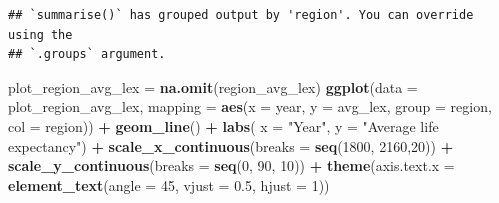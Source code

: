 \documentclass[
]{article}
\newenvironment{Shaded}{\begin{snugshade}}{\end{snugshade}}
\newcommand{\AttributeTok}[1]{\textcolor[rgb]{0.13,0.29,0.53}{#1}}
\newcommand{\CommentTok}[1]{\textcolor[rgb]{0.56,0.35,0.01}{\textit{#1}}}
\newcommand{\DecValTok}[1]{\textcolor[rgb]{0.00,0.00,0.81}{#1}}
\newcommand{\FloatTok}[1]{\textcolor[rgb]{0.00,0.00,0.81}{#1}}
\newcommand{\FunctionTok}[1]{\textcolor[rgb]{0.13,0.29,0.53}{\textbf{#1}}}
\newcommand{\NormalTok}[1]{#1}
\newcommand{\OtherTok}[1]{\textcolor[rgb]{0.56,0.35,0.01}{#1}}
\newcommand{\SpecialCharTok}[1]{\textcolor[rgb]{0.81,0.36,0.00}{\textbf{#1}}}
\newcommand{\StringTok}[1]{\textcolor[rgb]{0.31,0.60,0.02}{#1}}
\begin{document}
\begin{verbatim}
## `summarise()` has grouped output by 'region'. You can override using the
## `.groups` argument.
\end{verbatim}

\begin{Shaded}
\end{Shaded}

\begin{Shaded}
\begin{Highlighting}[]
\NormalTok{plot\_region\_avg\_lex }\OtherTok{=} \FunctionTok{na.omit}\NormalTok{(region\_avg\_lex)}
\FunctionTok{ggplot}\NormalTok{(}\AttributeTok{data =}\NormalTok{ plot\_region\_avg\_lex, }\AttributeTok{mapping =} \FunctionTok{aes}\NormalTok{(}\AttributeTok{x =}\NormalTok{ year, }\AttributeTok{y =}\NormalTok{ avg\_lex, }\AttributeTok{group =}\NormalTok{ region, }\AttributeTok{col =}\NormalTok{ region)) }\SpecialCharTok{+}
  \FunctionTok{geom\_line}\NormalTok{() }\SpecialCharTok{+}
  \FunctionTok{labs}\NormalTok{(}
       \AttributeTok{x =} \StringTok{"Year"}\NormalTok{,}
       \AttributeTok{y =} \StringTok{"Average life expectancy"}\NormalTok{) }\SpecialCharTok{+}
  \FunctionTok{scale\_x\_continuous}\NormalTok{(}\AttributeTok{breaks =} \FunctionTok{seq}\NormalTok{(}\DecValTok{1800}\NormalTok{, }\DecValTok{2160}\NormalTok{,}\DecValTok{20}\NormalTok{)) }\SpecialCharTok{+}
  \FunctionTok{scale\_y\_continuous}\NormalTok{(}\AttributeTok{breaks =} \FunctionTok{seq}\NormalTok{(}\DecValTok{0}\NormalTok{, }\DecValTok{90}\NormalTok{, }\DecValTok{10}\NormalTok{)) }\SpecialCharTok{+}
  \FunctionTok{theme}\NormalTok{(}\AttributeTok{axis.text.x =} \FunctionTok{element\_text}\NormalTok{(}\AttributeTok{angle =} \DecValTok{45}\NormalTok{, }\AttributeTok{vjust =} \FloatTok{0.5}\NormalTok{, }\AttributeTok{hjust =} \DecValTok{1}\NormalTok{))}
\end{Highlighting}
\end{Shaded}
\end{document}
